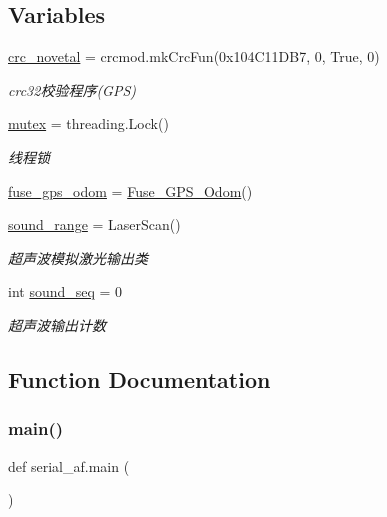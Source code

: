 \subsection*{Variables}
\begin{DoxyCompactItemize}
\item 
\hyperlink{namespaceserial__af_a193ccba55b824330c7d21685b14a6284}{crc\+\_\+novetal} = crcmod.\+mk\+Crc\+Fun(0x104\+C11\+D\+B7, 0, True, 0)
\begin{DoxyCompactList}\small\item\em crc32校验程序(\+G\+P\+S) \end{DoxyCompactList}\item 
\hyperlink{namespaceserial__af_ad9b17c1f4492249eb921e7d5ec2a50ec}{mutex} = threading.\+Lock()
\begin{DoxyCompactList}\small\item\em 线程锁 \end{DoxyCompactList}\item 
\hyperlink{namespaceserial__af_a35540907277fe0c8e8c3abb88c3e5186}{fuse\+\_\+gps\+\_\+odom} = \hyperlink{classserial__af_1_1_fuse___g_p_s___odom}{Fuse\+\_\+\+G\+P\+S\+\_\+\+Odom}()
\item 
\hyperlink{namespaceserial__af_ae7aa8b1dc138cd3376ea6f83f4e47c24}{sound\+\_\+range} = Laser\+Scan()
\begin{DoxyCompactList}\small\item\em 超声波模拟激光输出类 \end{DoxyCompactList}\item 
int \hyperlink{namespaceserial__af_a48355ec276db91ffbf4665ab2c216d76}{sound\+\_\+seq} = 0
\begin{DoxyCompactList}\small\item\em 超声波输出计数 \end{DoxyCompactList}\end{DoxyCompactItemize}


\subsection{Function Documentation}
\mbox{\label{namespaceserial__af_af84db65a10932c888008e984b4bf980e}} 
\subsubsection{\texorpdfstring{main()}{main()}}
{\footnotesize\ttfamily def serial\+\_\+af.\+main (\begin{DoxyParamCaption}{ }\end{DoxyParamCaption})}



